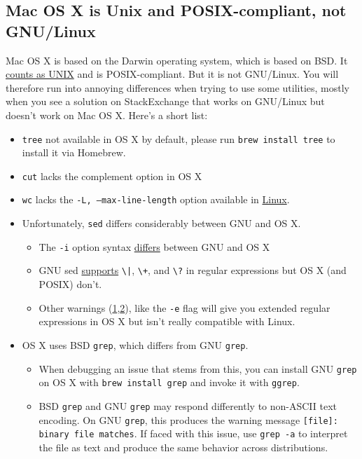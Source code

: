 \subsection{Mac OS X is Unix and POSIX-compliant, not GNU/Linux}

Mac OS X is based on the Darwin operating system, which is based on BSD.
It \href{https://www.opengroup.org/openbrand/register/apple.htm}{counts as UNIX} and is POSIX-compliant.
But it is not GNU/Linux.
You will therefore run into annoying differences when trying to use some utilities, mostly when you see a solution on StackExchange that works on GNU/Linux but doesn't work on Mac OS X.
Here's a short list:
\begin{itemize}
\item \texttt{tree} not available in OS X by default, please run \texttt{brew install tree} to install it via Homebrew.
\item \texttt{cut} lacks the complement option in OS X
\item \texttt{wc} lacks the \texttt{-L, --max-line-length} option available in \href{https://linux.die.net/man/1/wc}{Linux}.
\item Unfortunately, \texttt{sed} differs considerably between GNU and OS X.
\begin{itemize}
	\item The \texttt{-i} option syntax \href{https://stackoverflow.com/questions/2320564/i-need-my-sed-i-command-for-in-place-editing-to-work-with-both-gnu-sed-and-bsd}{differs} between GNU and OS X
	\item GNU sed \href{https://unix.stackexchange.com/questions/13711/differences-between-sed-on-mac-osx-and-other-standard-sed}{supports} \texttt{\textbackslash|}, \texttt{\textbackslash+}, and \texttt{\textbackslash?} in regular expressions but OS X (and POSIX) don't.
	\item Other warnings (\href{https://unix.stackexchange.com/a/131940}{1},\href{https://stackoverflow.com/questions/1227174/sed-on-os-x-cant-seem-to-use-in-regexps}{2}), like the \texttt{-e} flag will give you extended regular expressions in OS X but isn't really compatible with Linux.
\end{itemize}

\item OS X uses BSD \texttt{grep}, which differs from GNU \texttt{grep}. 
\begin{itemize}
    \item When debugging an issue that stems from this, you can install GNU
        \texttt{grep} on OS X with \texttt{brew install grep} and invoke it with \texttt{ggrep}.
    \item BSD \texttt{grep} and GNU \texttt{grep} may respond differently to non-ASCII text encoding.
        On GNU \texttt{grep}, this produces the warning message \texttt{[file]: binary file matches}.
        If faced with this issue, use \texttt{grep -a} to interpret the file as text
        and produce the same behavior across distributions.
\end{itemize}

\end{itemize}

